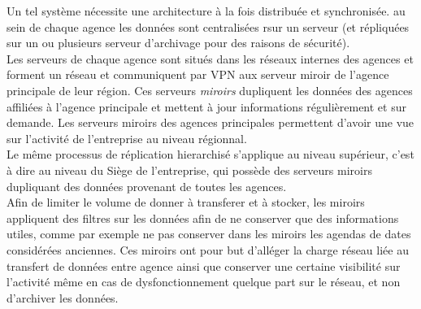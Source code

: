 \documentclass[a4paper]{article}
\begin{document}
Un tel système nécessite une architecture à la fois distribuée et synchronisée.
au sein de chaque agence les données sont centralisées rsur un serveur (et répliquées sur un ou plusieurs serveur d'archivage pour des raisons de sécurité).\\
Les serveurs de chaque agence sont situés dans les réseaux internes des agences et forment un réseau et communiquent par VPN aux serveur miroir de l'agence principale de leur région. 
Ces serveurs \textit{miroirs} dupliquent les données des agences affiliées à l'agence principale et mettent à jour informations régulièrement et sur demande.
Les serveurs miroirs des agences principales permettent d'avoir une vue sur l'activité de l'entreprise au niveau régionnal.\\
Le même processus de réplication hierarchisé s'applique au niveau supérieur, c'est à dire au niveau du Siège de l'entreprise, qui possède des serveurs miroirs dupliquant des données provenant de toutes les agences.\\
Afin de limiter le volume de donner à transferer et à stocker, les miroirs appliquent des filtres sur les données afin de ne conserver que des informations utiles, comme par exemple ne pas conserver dans les miroirs les agendas de dates considérées anciennes. Ces miroirs ont pour but d'alléger la charge réseau liée au transfert de données entre agence ainsi que conserver une certaine visibilité sur l'activité même en cas de dysfonctionnement quelque part sur le réseau, et non d'archiver les données.
\end{document}
